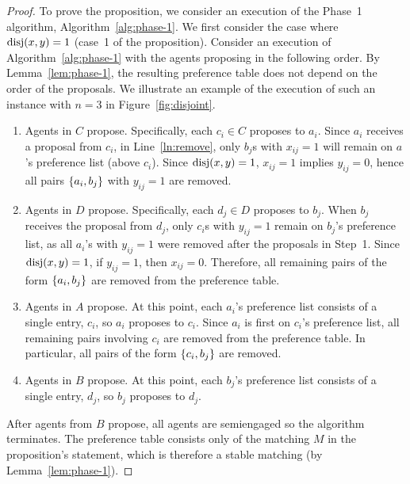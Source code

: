 \begin{proof}
    To prove the proposition, we consider an execution of the Phase~1 algorithm, Algorithm~\ref{alg:phase-1}. We first consider the case where $\operatorname{disj}(x, y) = 1$ (case~1 of the proposition). Consider an execution of Algorithm~\ref{alg:phase-1} with the agents proposing in the following order. By Lemma~\ref{lem:phase-1}, the resulting preference table does not depend on the order of the proposals. We illustrate an example of the execution of such an instance with $n = 3$ in Figure~\ref{fig:disjoint}.
    \begin{enumerate}
        \item Agents in $C$ propose. Specifically, each $c_i \in C$ proposes to $a_i$. Since $a_i$ receives a proposal from $c_i$, in Line~\ref{ln:remove}, only $b_j$s with $x_{ij} = 1$ will remain on $a$'s preference list (above $c_i$). Since $\operatorname{disj}(x, y) = 1$, $x_{ij} = 1$ implies $y_{ij} = 0$, hence all pairs $\left\{a_i, b_j\right\}$ with $y_{ij} = 1$ are removed.
        \item Agents in $D$ propose. Specifically, each $d_j \in D$ proposes to $b_j$. When $b_j$ receives the proposal from $d_j$, only $c_i$s with $y_{ij} = 1$ remain on $b_j$'s preference list, as all $a_i$'s with $y_{ij} = 1$ were removed after the proposals in Step~1. Since $\operatorname{disj}(x, y) = 1$, if $y_{ij} = 1$, then $x_{ij} = 0$. Therefore, all remaining pairs of the form $\left\{a_i, b_j\right\}$ are removed from the preference table.
        \item Agents in $A$ propose. At this point, each $a_i$'s preference list consists of a single entry, $c_i$, so $a_i$ proposes to $c_i$. Since $a_i$ is first on $c_i$'s preference list, all remaining pairs involving $c_i$ are removed from the preference table. In particular, all pairs of the form $\left\{c_i, b_j\right\}$ are removed.
        \item Agents in $B$ propose. At this point, each $b_j$'s preference list consists of a single entry, $d_j$, so $b_j$ proposes to $d_j$.
    \end{enumerate}
    After agents from $B$ propose, all agents are semiengaged so the algorithm terminates. The preference table consists only of the matching $M$ in the proposition's statement, which is therefore a stable matching (by Lemma~\ref{lem:phase-1}).
    

\end{proof}
